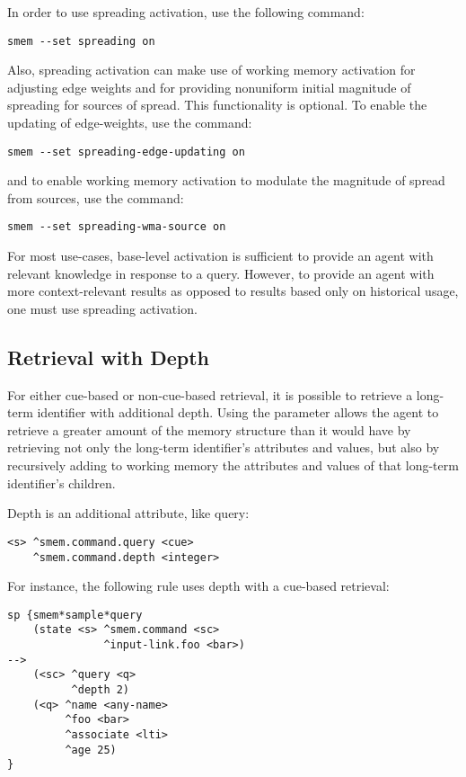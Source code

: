In order to use spreading activation, use the following command:

\begin{verbatim}
smem --set spreading on
\end{verbatim}

Also, spreading activation can make use of working memory activation for adjusting edge weights and for providing nonuniform initial magnitude of spreading for sources of spread. This functionality is optional. To enable the updating of edge-weights, use the command: 

\begin{verbatim}
smem --set spreading-edge-updating on
\end{verbatim} 

and to enable working memory activation to modulate the magnitude of spread from sources, use the command: 

\begin{verbatim}
smem --set spreading-wma-source on
\end{verbatim}

For most use-cases, base-level activation is sufficient to provide an agent with relevant knowledge in response to a query. However, to provide an agent with more context-relevant results as opposed to results based only on historical usage, one must use spreading activation.

\subsection{Retrieval with Depth}

For either cue-based or non-cue-based retrieval, it is possible to retrieve a long-term identifier with additional depth. Using the  parameter allows the agent to retrieve a greater amount of the memory structure than it would have by retrieving not only the long-term identifier's attributes and values, but also by recursively adding to working memory the attributes and values of that long-term identifier's children.

Depth is an additional  attribute, like query:

\begin{verbatim}
<s> ^smem.command.query <cue>
    ^smem.command.depth <integer>
\end{verbatim}

For instance, the following rule uses depth with a cue-based retrieval:

\begin{verbatim}
sp {smem*sample*query
    (state <s> ^smem.command <sc>
               ^input-link.foo <bar>)
-->
    (<sc> ^query <q>
          ^depth 2)
    (<q> ^name <any-name>
         ^foo <bar>
         ^associate <lti>
         ^age 25)
}
\end{verbatim}

